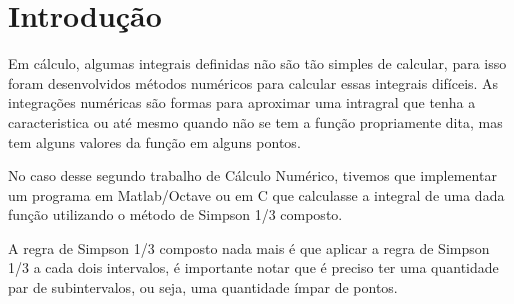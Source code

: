 \chapter*[Introdução]{Introdução}
Em cálculo, algumas integrais definidas não são tão simples de calcular, para
isso foram desenvolvidos métodos numéricos para calcular essas integrais
difíceis. As integrações numéricas são formas para aproximar uma intragral que
tenha a caracteristica ou até mesmo quando não se tem a função propriamente
dita, mas tem alguns valores da função em alguns pontos.

No caso desse segundo trabalho de Cálculo Numérico, tivemos que implementar um
programa em Matlab/Octave ou em C que calculasse a integral de uma dada função
utilizando o método de Simpson 1/3 composto.

A regra de Simpson 1/3 composto nada mais é que aplicar a regra de Simpson 1/3 a
cada dois intervalos, é importante notar que é preciso ter uma quantidade par de
subintervalos, ou seja, uma quantidade ímpar de pontos.

